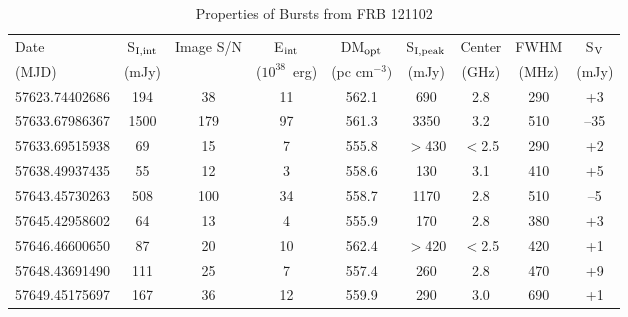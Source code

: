 \documentclass[twocolumn]{aastex61}
\newcommand{\frb}{FRB 121102}
\begin{document}
\begin{table}
\caption{Properties of Bursts from \frb}
\centering
\begin{tabular}{lcccccccc}
\hline
Date                & S$_{\rm{I,int}}$  & Image S/N & E$_{\rm{int}}$ & DM$_{\rm{opt}}$ & S$_{\rm{I,peak}}$ & Center & FWHM & S$_{\rm{V}}$ \\
(MJD)               & (mJy)           &           & ($10^{38}$\ erg) & (pc cm$^{-3})$ & (mJy) & (GHz)  & (MHz) & (mJy) \\ \hline
57623.74402686      & 194             & 38        & 11 & 562.1 & 690 & 2.8 & 290 & +3 \\ %
57633.67986367      & 1500            & 179       & 97 & 561.3 & 3350 & 3.2 & 510 & --35 \\ %
57633.69515938\tablenotemark{a} & 69  & 15        & 7 & 555.8 & $>$430 & $<$2.5 & 290 & +2 \\ %
57638.49937435      & 55              & 12        & 3 & 558.6 & 130 & 3.1 & 410 & +5 \\ %
57643.45730263      & 508             & 100       & 34 & 558.7 & 1170 & 2.8 & 510 & --5 \\ %
57645.42958602      & 64              & 13        & 4 & 555.9 & 170 & 2.8 & 380 & +3 \\ %
57646.46600650\tablenotemark{a} & 87  & 20        & 10 & 562.4 & $>$420 & $<$2.5 & 420 & +1 \\ %
57648.43691490\tablenotemark{b} & 111 & 25        & 7 & 557.4 & 260 & 2.8 & 470 & +9 \\ %
57649.45175697      & 167             & 36        & 12 & 559.9 & 290 & 3.0 & 690 & +1 \\ \hline %
\end{tabular}
\label{tab:spec}
\end{table} 
\end{document}
